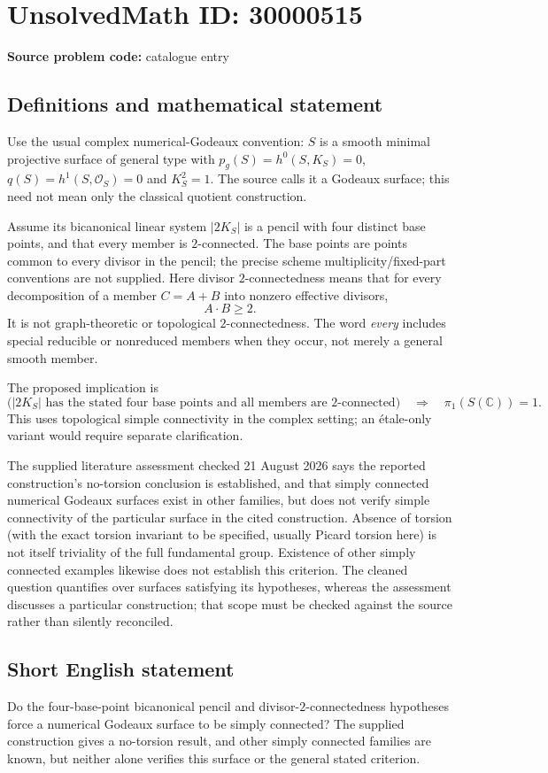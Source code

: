 \documentclass[11pt]{article}
\newcommand{\C}{\mathbb{C}}
\begin{document}
\section*{UnsolvedMath ID: 30000515}
\textbf{Source problem code:} catalogue entry
\subsection{Definitions and mathematical statement}
Use the usual complex numerical-Godeaux convention: $S$ is a smooth minimal projective surface of general type with $p_g(S)=h^0(S,K_S)=0$, $q(S)=h^1(S,\mathcal O_S)=0$ and $K_S^2=1$. The source calls it a Godeaux surface; this need not mean only the classical quotient construction.

Assume its bicanonical linear system $|2K_S|$ is a pencil with four distinct base points, and that every member is $2$-connected. The base points are points common to every divisor in the pencil; the precise scheme multiplicity/fixed-part conventions are not supplied. Here divisor $2$-connectedness means that for every decomposition of a member $C=A+B$ into nonzero effective divisors,
\[
 A\cdot B\geq2.
\]
It is not graph-theoretic or topological $2$-connectedness. The word \emph{every} includes special reducible or nonreduced members when they occur, not merely a general smooth member.

The proposed implication is
\[
 \bigl(|2K_S|\text{ has the stated four base points and all members are }2\text{-connected}\bigr)
 \quad\Longrightarrow\quad \pi_1(S(\C))=1.
\]
This uses topological simple connectivity in the complex setting; an \'etale-only variant would require separate clarification.

The supplied literature assessment checked 21 August 2026 says the reported construction's no-torsion conclusion is established, and that simply connected numerical Godeaux surfaces exist in other families, but does not verify simple connectivity of the particular surface in the cited construction. Absence of torsion (with the exact torsion invariant to be specified, usually Picard torsion here) is not itself triviality of the full fundamental group. Existence of other simply connected examples likewise does not establish this criterion. The cleaned question quantifies over surfaces satisfying its hypotheses, whereas the assessment discusses a particular construction; that scope must be checked against the source rather than silently reconciled.
\subsection{Short English statement}
Do the four-base-point bicanonical pencil and divisor-$2$-connectedness hypotheses force a numerical Godeaux surface to be simply connected? The supplied construction gives a no-torsion result, and other simply connected families are known, but neither alone verifies this surface or the general stated criterion.
\end{document}
